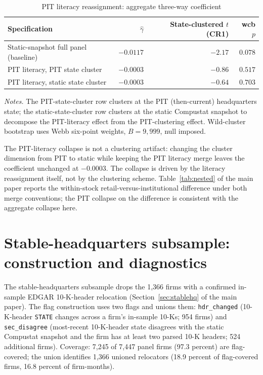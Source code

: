 \documentclass[12pt]{article}
\begin{document}
\begin{table}[h]
\centering
\caption{PIT literacy reassignment: aggregate three-way coefficient}
\footnotesize
\begin{tabular}{lrrr}
\toprule
Specification & $\hat\gamma$ & State-clustered $t$ (CR1) & wcb $p$ \\
\midrule
Static-snapshot full panel (baseline) & $-0.0117$ & $-2.17$ & $0.078$ \\
PIT literacy, PIT state cluster        & $-0.0003$ & $-0.86$ & $0.517$ \\
PIT literacy, static state cluster     & $-0.0003$ & $-0.64$ & $0.703$ \\
\bottomrule
\end{tabular}

\medskip
{\footnotesize\textit{Notes.} The PIT-state-cluster row clusters at the PIT (then-current) headquarters state; the static-state-cluster row clusters at the static Compustat snapshot to decompose the PIT-literacy effect from the PIT-clustering effect. Wild-cluster bootstrap uses Webb six-point weights, $B = 9{,}999$, null imposed.}
\end{table}

The PIT-literacy collapse is not a clustering artifact: changing the cluster dimension from PIT to static while keeping the PIT literacy merge leaves the coefficient unchanged at $-0.0003$. The collapse is driven by the literacy reassignment itself, not by the clustering scheme. Table~\ref{tab:nested} of the main paper reports the within-stock retail-versus-institutional difference under both merge conventions; the PIT collapse on the difference is consistent with the aggregate collapse here.

\section{Stable-headquarters subsample: construction and diagnostics}
\label{ia:stablehq}

The stable-headquarters subsample drops the 1,366 firms with a confirmed in-sample EDGAR 10-K-header relocation (Section~\ref{sec:stablehq} of the main paper). The flag construction uses two flags and unions them: \texttt{hdr\_changed} (10-K-header \texttt{STATE} changes across a firm's in-sample 10-Ks; 954 firms) and \texttt{sec\_disagree} (most-recent 10-K-header state disagrees with the static Compustat snapshot and the firm has at least two parsed 10-K headers; 524 additional firms). Coverage: 7,245 of 7,447 panel firms (97.3 percent) are flag-covered; the union identifies 1,366 unioned relocators (18.9 percent of flag-covered firms, 16.8 percent of firm-months).
\end{document}
